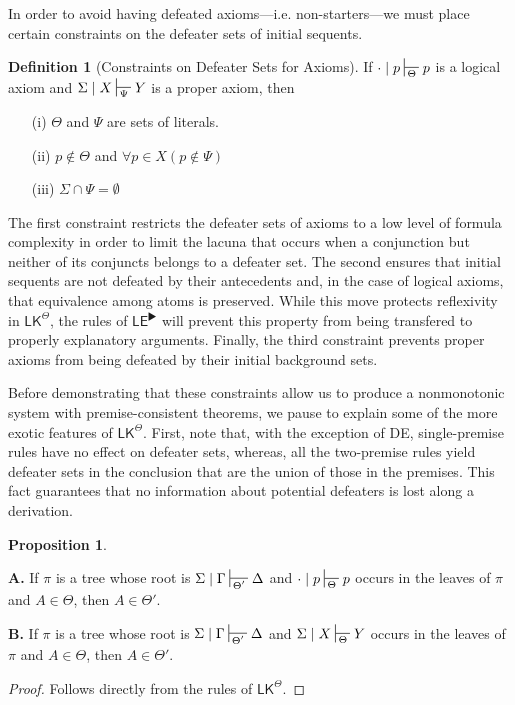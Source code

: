 \documentclass{article}
\theoremstyle{definition}
\theoremstyle{definition}
\theoremstyle{definition}
\theoremstyle{definition}
\newtheorem{definition}{Definition}
\theoremstyle{remark}
\theoremstyle{definition}
\newtheorem{proposition}{Proposition}
\theoremstyle{definition}
\begin{document}
In order to avoid having defeated axioms---i.e. non-starters---we must place certain constraints on the defeater sets of initial sequents.

\begin{definition}[Constraints on Defeater Sets for Axioms]\label{conondefsetax}
	If  $ \cdot\mid p \sststile{\Theta}{} p$ is a logical axiom and $ \Sigma\mid X \sststile{\Psi}{} Y $ is a proper axiom, then
	
	\begin{itemize}
		\item[(i)]    $\Theta$ and $\Psi$ are sets of literals.
		\item[(ii)]    $p \not\in \Theta$ and $\forall p \in X (p \not\in \Psi)$
		\item [(iii)] $ \Sigma \cap \Psi = \emptyset $
	\end{itemize}
\end{definition}

The first constraint restricts the defeater sets of axioms to a low level of formula complexity in order to limit the lacuna that occurs when a conjunction but neither of its conjuncts belongs to a defeater set. The second ensures that initial sequents are not defeated by their antecedents and, in the case of logical axioms, that equivalence among atoms is preserved. While this move protects reflexivity in $ \mathsf{LK^\Theta}$, the rules of $ \mathsf{LE}^\RHD$ will prevent this property from being transfered to properly explanatory arguments. Finally, the third constraint prevents proper axioms from being defeated by their initial background sets.

Before demonstrating that these constraints allow us to produce a nonmonotonic system with premise-consistent theorems, we pause to explain some of the more exotic features of $ \mathsf{LK^\Theta}$. First, note that, with the exception of \textsf{DE}, single-premise rules have no effect on defeater sets, whereas, all the two-premise rules yield defeater sets in the conclusion that are the union of those in the premises. This fact guarantees that no information about potential defeaters is lost along a derivation. 

\begin{proposition}\label{defeatpreserv}
	
	\textbf{A.}
	If $ \pi $ is a tree whose root is $ \Sigma\mid \Gamma \sststile{\Theta'}{}  \Delta $ and $\cdot\mid p \sststile{\Theta}{} p$ occurs in the leaves of $ \pi $ and $ A \in \Theta $, then $ A \in \Theta' $.
	
	\textbf{B.}
	If $ \pi $ is a tree whose root is $ \Sigma\mid \Gamma \sststile{\Theta'}{}  \Delta $ and $ \Sigma\mid X \sststile{\Theta}{} Y $ occurs in the leaves of $ \pi $ and $ A \in \Theta $, then $ A \in \Theta' $.
	
	
	\begin{proof}
		Follows directly from the rules of $ \mathsf{LK^\Theta}$.
	\end{proof}
\end{proposition}
\end{document}
